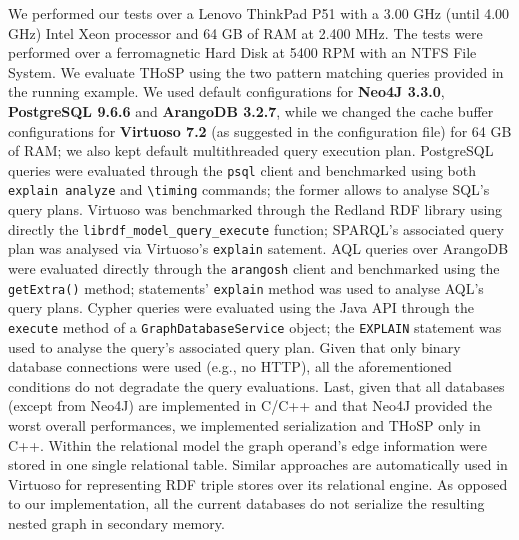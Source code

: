 We performed our tests over a Lenovo ThinkPad P51 with a 3.00 GHz (until 4.00 GHz) Intel Xeon processor and 64 GB of RAM at 2.400 MHz. The tests were performed over a ferromagnetic Hard Disk at 5400 RPM with an NTFS File System. We evaluate THoSP using the two pattern matching queries provided in the running example. 
We used default configurations for  \textbf{Neo4J 3.3.0}, \textbf{PostgreSQL 9.6.6} and \textbf{ArangoDB 3.2.7}, while we changed the cache buffer configurations for \textbf{Virtuoso 7.2} (as suggested in the configuration file) for 64 GB of RAM; we also kept  default multithreaded query execution plan. PostgreSQL queries were evaluated through the \texttt{psql} client and benchmarked using both \texttt{explain analyze} and \texttt{\textbackslash timing} commands; the former   allows to analyse SQL's query plans. Virtuoso was benchmarked through the Redland RDF library using directly the \texttt{librdf\_model\_query\_execute} function; SPARQL's associated query plan was analysed via Virtuoso's \texttt{explain} satement. 
AQL queries over {ArangoDB} were evaluated directly through the \texttt{arangosh} client and benchmarked using the \texttt{getExtra()} method; statements' \texttt{explain} method was used to analyse AQL's query plans. %
Cypher queries were evaluated using the Java API through the \texttt{execute} method of a \texttt{GraphDatabaseService} object; the \texttt{EX\-PLAIN} statement was used to analyse the query's associated query plan. Given that only binary database connections were used (e.g., no HTTP),
all the aforementioned conditions do not degradate the query evaluations. Last, given that all databases (except from Neo4J) are implemented in C/C++ and that Neo4J provided the worst overall performances, we implemented  serialization and THoSP only in C++.
Within the relational model the graph operand's edge information were  stored in one single relational table. Similar approaches are automatically used in Virtuoso for representing RDF triple stores over its relational engine. As opposed to our implementation, all the current databases do not serialize the resulting nested graph in secondary memory.



